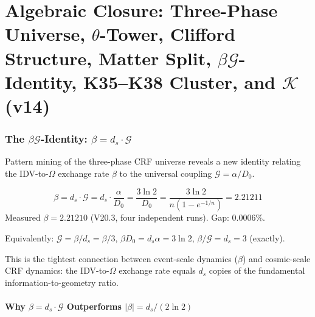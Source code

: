 \documentclass[12pt, a4paper]{article}
\begin{document}
\clearpage

\part{Algebraic Closure: Three-Phase Universe, $\theta$-Tower, Clifford Structure,
Matter Split, $\beta\mathcal{G}$-Identity, K35--K38 Cluster, and $\mathcal{K}$ (v14)}

\section{The $\beta\mathcal{G}$-Identity: $\beta = d_s \cdot \mathcal{G}$}

Pattern mining of the three-phase CRF universe reveals a new identity relating
the IDV-to-$\Omega$ exchange rate $\beta$ to the universal coupling $\mathcal{G} = \alpha/D_0$.

\begin{keybox}[title={$\beta = d_s \cdot \mathcal{G}$ --- Tightest Identity in CRF (gap 0.0006\%)}]
\[
  \boxed{\beta = d_s \cdot \mathcal{G} = d_s \cdot \frac{\alpha}{D_0}
  = \frac{3\ln 2}{D_0} = \frac{3\ln 2}{n(1-e^{-1/n})} = 2.21211}
\]
Measured $\beta = 2.21210$ (V20.3, four independent runs). Gap: 0.0006\%.

Equivalently: $\mathcal{G} = \beta/d_s = \beta/3$, \quad $\beta D_0 = d_s\alpha = 3\ln 2$,
\quad $\beta/\mathcal{G} = d_s = 3$ (exactly).

This is the tightest connection between event-scale dynamics ($\beta$) and
cosmic-scale CRF dynamics: the IDV-to-$\Omega$ exchange rate equals $d_s$ copies of
the fundamental information-to-geometry ratio.
\end{keybox}

\subsection{Why $\beta = d_s \cdot \mathcal{G}$ Outperforms $|\beta| = d_s/(2\ln 2)$}
\end{document}
